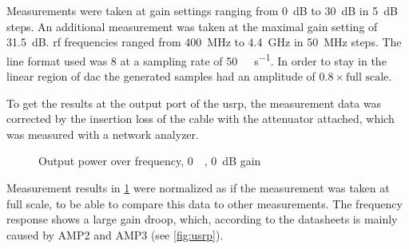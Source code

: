 \documentclass[12pt,a4paper,parskip=full,abstracton]{scrartcl}
\begin{document}
Measurements were taken at gain settings ranging from \SI{0}{\deci\bel} to \SI{30}{\deci\bel}
in \SI{5}{\deci\bel} steps. An additional measurement was taken at the maximal gain
setting of \SI{31.5}{\deci\bel}. \gls{rf} frequencies ranged from \SI{400}{\mega\hertz} to
\SI{4.4}{\giga\hertz} in \SI{50}{\mega\hertz} steps. The line format used was
\SI{8}{\bit} at a sampling rate of \SI{50}{\mega\samples\per\second}. In order to stay
in the linear region of \gls{dac} the generated samples had an amplitude
of $0.8 \times \text{full scale}$.

To get the results at the output port of the \gls{usrp}, the measurement data was corrected
by the insertion loss of the cable with the attenuator attached, which was measured
with a network analyzer.

\clearpage

\begin{figure}[htb]
    \centering
{}
\caption{Output power over frequency, \SI{0}{\deci\belfs}, \SI{0}{\deci\bel} gain}
    \label{fig:outputrf08}
\end{figure}

Measurement results in \cref{fig:outputrf08} were normalized as if the measurement
was taken at full scale, to be able to compare this data to other measurements.
The frequency response shows a large gain droop, which, according to the datasheets
is mainly caused by AMP2\cite{amp2} and AMP3\cite{amp3} (see \cref{fig:usrp}).
\end{document}
